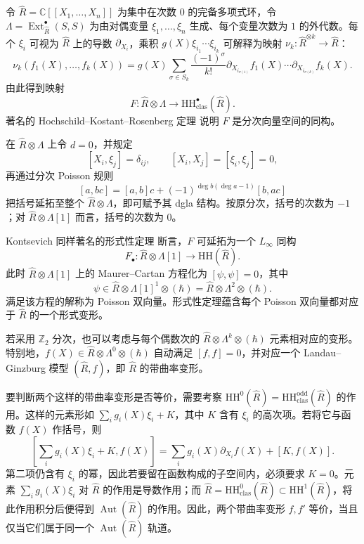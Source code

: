 \begin{example}
令 $\widehat R=\mathbb C[[X_1,\ldots,X_n]]$ 为集中在次数 $0$ 的完备多项式环，令 $\Lambda=\operatorname{Ext}^{\bullet}_{\widehat R}(S,S)$ 为由对偶变量 $\xi_1,\ldots,\xi_n$ 生成、每个变量次数为 $1$ 的外代数。每个 $\xi_i$ 可视为 $\widehat R$ 上的导数 $\partial_{X_i}$，乘积 $g(X)\xi_{i_1}\cdots\xi_{i_k}$ 可解释为映射 $\nu_k:\widehat R^{\otimes k}\to\widehat R$：
\[
  \nu_k(f_1(X),\ldots,f_k(X))
  =g(X)\sum_{\sigma\in S_k}\frac{(-1)^\sigma}{k!}
  \partial_{X_{i_{\sigma(1)}}}f_1(X)\cdots
  \partial_{X_{i_{\sigma(k)}}}f_k(X).
\]
由此得到映射
\[
  F:\widehat R\otimes\Lambda\longrightarrow\mathrm{HH}^{\bullet}_{\mathrm{clas}}(\widehat R).
\]
著名的 Hochschild--Kostant--Rosenberg 定理 说明 $F$ 是分次向量空间的同构。

在 $\widehat R\otimes\Lambda$ 上令 $d=0$，并规定
\[
  [X_i,\xi_j]=\delta_{ij},\qquad [X_i,X_j]=[\xi_i,\xi_j]=0,
\]
再通过分次 Poisson 规则
\[
  [a,bc]=[a,b]c+(-1)^{\deg b(\deg a-1)}[b,ac]
\]
把括号延拓至整个 $\widehat R\otimes\Lambda$，即可赋予其 dgla 结构。按原分次，括号的次数为 $-1$；对 $\widehat R\otimes\Lambda[1]$ 而言，括号的次数为 $0$。

Kontsevich 同样著名的形式性定理 断言，$F$ 可延拓为一个 $L_\infty$ 同构
\[
  F_{\bullet}:\widehat R\otimes\Lambda[1]\longrightarrow\mathrm{HH}(\widehat R).
\]
此时 $\widehat R\otimes\Lambda[1]$ 上的 Maurer--Cartan 方程化为 $[\psi,\psi]=0$，其中
\[
  \psi\in\widehat R\otimes\Lambda[1]^1\otimes(\hbar)
  =\widehat R\otimes\Lambda^2\otimes(\hbar).
\]
满足该方程的解称为 Poisson 双向量。形式性定理蕴含每个 Poisson 双向量都对应于 $\widehat R$ 的一个形式变形。

若采用 $\mathbb Z_2$ 分次，也可以考虑与每个偶数次的 $\widehat R\otimes\Lambda^k\otimes(\hbar)$ 元素相对应的变形。特别地，$f(X)\in\widehat R\otimes\Lambda^0\otimes(\hbar)$ 自动满足 $[f,f]=0$，并对应一个 Landau--Ginzburg 模型 $(\widehat R,f)$，即 $\widehat R$ 的带曲率变形。

要判断两个这样的带曲率变形是否等价，需要考察 $\mathrm{HH}^{0}(\widehat R)=\mathrm{HH}^{\mathrm{odd}}_{\mathrm{clas}}(\widehat R)$ 的作用。这样的元素形如 $\sum_i g_i(X)\xi_i+K$，其中 $K$ 含有 $\xi_i$ 的高次项。若将它与函数 $f(X)$ 作括号，则
\[
  \left[\sum_i g_i(X)\xi_i+K,f(X)\right]
  =\sum_i g_i(X)\partial_{X_i}f(X)+[K,f(X)].
\]
第二项仍含有 $\xi_i$ 的幂，因此若要留在函数构成的子空间内，必须要求 $K=0$。元素 $\sum_i g_i(X)\xi_i$ 对 $\widehat R$ 的作用是导数作用；而 $\widehat R=\mathrm{HH}^{0}_{\mathrm{clas}}(\widehat R)\subset\mathrm{HH}^{1}(\widehat R)$，将此作用积分后便得到 $\operatorname{Aut}(\widehat R)$ 的作用。因此，两个带曲率变形 $f,f'$ 等价，当且仅当它们属于同一个 $\operatorname{Aut}(\widehat R)$ 轨道。
\end{example}

